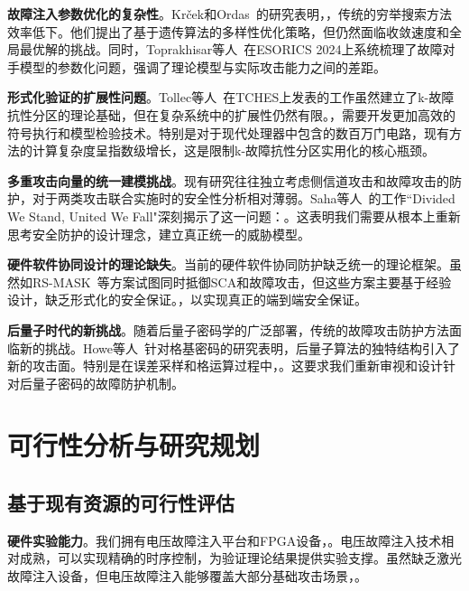 \documentclass{article}
\begin{document}
\textbf{故障注入参数优化的复杂性}。Krček和Ordas~\cite{ESORICS:KrcOrd24}的研究表明，，传统的穷举搜索方法效率低下。他们提出了基于遗传算法的多样性优化策略，但仍然面临收敛速度和全局最优解的挑战。同时，Toprakhisar等人~\cite{ESORICS:TopNikNik24}在ESORICS 2024上系统梳理了故障对手模型的参数化问题，强调了理论模型与实际攻击能力之间的差距。

\textbf{形式化验证的扩展性问题}。Tollec等人~\cite{TCHES:THNABC24}在TCHES上发表的工作虽然建立了k-故障抗性分区的理论基础，但在复杂系统中的扩展性仍然有限。，需要开发更加高效的符号执行和模型检验技术。特别是对于现代处理器中包含的数百万门电路，现有方法的计算复杂度呈指数级增长，这是限制k-故障抗性分区实用化的核心瓶颈。

\textbf{多重攻击向量的统一建模挑战}。现有研究往往独立考虑侧信道攻击和故障攻击的防护，对于两类攻击联合实施时的安全性分析相对薄弱。Saha等人~\cite{COSADE:SahBagJapMuk21}的工作``Divided We Stand, United We Fall"深刻揭示了这一问题：。这表明我们需要从根本上重新思考安全防护的设计理念，建立真正统一的威胁模型。

\textbf{硬件软件协同设计的理论缺失}。当前的硬件软件协同防护缺乏统一的理论框架。虽然如RS-MASK~\cite{IEEE-TCAD:RamAmp20}等方案试图同时抵御SCA和故障攻击，但这些方案主要基于经验设计，缺乏形式化的安全保证。，以实现真正的端到端安全保证。

\textbf{后量子时代的新挑战}。随着后量子密码学的广泛部署，传统的故障攻击防护方法面临新的挑战。Howe等人~\cite{IEEE-HOST:HowKhaMarNor19}针对格基密码的研究表明，后量子算法的独特结构引入了新的攻击面。特别是在误差采样和格运算过程中，。这要求我们重新审视和设计针对后量子密码的故障防护机制。

\section{可行性分析与研究规划}

\subsection{基于现有资源的可行性评估}

\textbf{硬件实验能力}。我们拥有电压故障注入平台和FPGA设备，。电压故障注入技术相对成熟，可以实现精确的时序控制，为验证理论结果提供实验支撑。虽然缺乏激光故障注入设备，但电压故障注入能够覆盖大部分基础攻击场景，。
\end{document}
